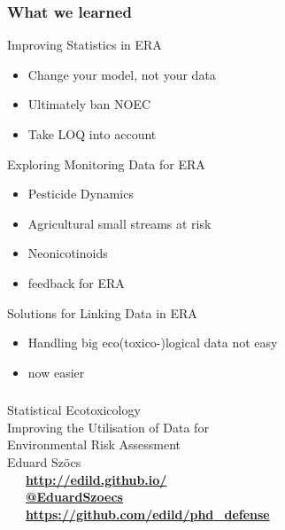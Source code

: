 \documentclass[10pt
	]{beamer}
\begin{document}
\begin{frame}
\frametitle{What we learned}
	\begin{exampleblock}{\checkmark Improving Statistics in ERA}
		\begin{itemize}
			\item Change your model, not your data
			\item Ultimately ban NOEC
			\item Take LOQ into account
		\end{itemize}
	\end{exampleblock}

\pause
	\begin{exampleblock}{\checkmark Exploring Monitoring Data for ERA}
		\begin{itemize}
			\item Pesticide Dynamics
			\item Agricultural small streams at risk
			\item Neonicotinoids
			\item feedback for ERA
		\end{itemize}
	\end{exampleblock}

\pause
	\begin{exampleblock}{\checkmark Solutions for Linking Data in ERA}
		\begin{itemize}
			\item Handling big eco(toxico-)logical data not easy
			\item now easier
		\end{itemize}
	\end{exampleblock}


\end{frame}


\begin{frame}[standout]
	\frametitle{}

	\vspace{1em}
	\Huge{Statistical Ecotoxicology} \\[0.3em]
	\large{Improving the Utilisation of Data for \\ Environmental Risk Assessment} \\[1em]

	\normalsize
	Eduard Szöcs \\[3em]

	\faLaptop~~~\textbf{\href{http://edild.github.io/}{http://edild.github.io/ }}\\[.5em]
	\faTwitter~~~\textbf{\href{http://twitter.com/EduardSzoecs}{@EduardSzoecs}} 	\\[0.5em]
	\faGift~~~\textbf{\href{https://github.com/edild/talk_work2}{https://github.com/edild/phd\_defense}}\\[4em]

	\begin{center}\ccbysa\end{center} 

\end{frame}
\end{document}
